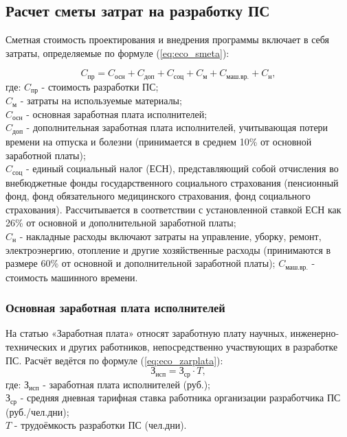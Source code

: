 
\subsection{Расчет сметы затрат на  разработку ПС}
Сметная стоимость проектирования и внедрения программы включает в себя  затраты, определяемые по формуле (\ref{eq:eco_smeta}):

\begin{equation}
C_{\mbox{пр}} = C_{\mbox{осн}} + C_{\mbox{доп}} + C_{\mbox{соц}} + C_{\mbox{м}} + C_{\mbox{маш.вр.}} + C_{\mbox{н}},
\label{eq:eco_smeta}
\end{equation}
где:	${C_{\mbox{пр}}}$ - стоимость разработки ПС; \\
	${C_{\mbox{м}}}$ - затраты на используемые материалы; \\
	${C_{\mbox{осн}}}$ - основная заработная плата исполнителей; \\
	${C_{\mbox{доп}}}$ - дополнительная заработная плата исполнителей, учитывающая потери времени на отпуска и болезни
		(принимается в среднем 10\% от основной заработной платы); \\
	${C_{\mbox{соц}}}$ - единый социальный налог (ЕСН), представляющий собой отчисления во внебюджетные фонды
		государственного социального страхования (пенсионный фонд, фонд обязательного медицинского страхования,
		фонд социального страхования). Рассчитывается в соответствии с установленной ставкой ЕСН как 26\% от
		основной и дополнительной заработной платы; \\
	${C_{\mbox{н}}}$ - накладные расходы включают затраты на управление, уборку, ремонт, электроэнергию, отопление и
		другие хозяйственные расходы (принимаются в размере 60\% от основной и дополнительной заработной платы);
	${C_{\mbox{маш.вр.}}}$ - стоимость машинного времени. \\

\subsubsection*{Основная заработная плата исполнителей}
На статью «Заработная плата» относят заработную плату научных, инженерно-технических и других работников,
непосредственно участвующих в разработке ПС. Расчёт ведётся по формуле (\ref{eq:eco_zarplata}):
\begin{equation}
\mbox{З}_{\mbox{исп}} = \mbox{З}_{\mbox{ср}} \cdot{T},
\label{eq:eco_zarplata}
\end{equation}
где:	${\mbox{З}_{\mbox{исп}}}$ - заработная плата исполнителей (руб.); \\
	${\mbox{З}_{\mbox{ср}}}$ -  средняя дневная тарифная ставка работника организации разработчика ПС (руб./чел.дни); \\
	${T}$ - трудоёмкость разработки ПС (чел.дни). \\

